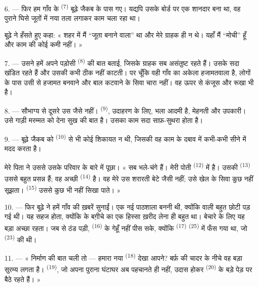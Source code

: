 6. --- फिर हम गाँव के  \textsuperscript{(7)} बूढ़े जैकब के पास गए।
यद्यपि उसके बोर्ड पर एक शानदार  बना था, वह पुराने घिसे जूतों में नया
तला लगाकर काम चला रहा था।

बूढ़े ने हँसते हुए कहा: « शहर में मैं “जूता बनाने वाला” था और मेरे ग्राहक ही न
थे। यहाँ मैं “मोची” हूँ और काम की कोई कमी नहीं। »

7. --- उसने हमें अपने पड़ोसी  \textsuperscript{(8)} की बात
बताई, जिसके ग्राहक सब असंतुष्ट रहते हैं। उसके  सदा खंडित रहते हैं
और उसकी  कभी ठीक नहीं काटती। पर चूँकि वही गाँव का अकेला
हजामतवाला है, लोगों के पास उसी से हजामत बनवाने और बाल कटवाने के सिवा चारा नहीं।
वह ऊपर से कंजूस और रूखा भी है।

8. --- सौभाग्य से दूसरे  उस जैसे नहीं। 
\textsuperscript{(9)}, उदाहरण के लिए, भला आदमी है, मेहनती और उपकारी। उसे गाड़ी
मरम्मत को देना सुख की बात है। उसका काम सदा साफ़-सुथरा होता है।

9. --- बूढ़े जैकब को  \textsuperscript{(10)} से भी कोई शिकायत न
थी, जिसकी वह काम के दबाव में कभी-कभी  सीने में मदद करता है।

मेरे पिता ने उससे उसके परिवार के बारे में पूछा। « सब भले-चंगे हैं। मेरी पोती
 \textsuperscript{(12)} में है। उसकी 
\textsuperscript{(13)} उससे बहुत प्रसन्न हैं; वह अच्छी 
\textsuperscript{(14)} है। वह मेरे उस शरारती बेटे जैसी नहीं; उसे खेल के सिवा कुछ
नहीं सूझता।  \textsuperscript{(15)} उससे कुछ भी नहीं
सिखा पाते। »

\VUsaut{3.0mm}
\VUsaut{3.0mm}

10. --- फिर बूढ़े ने हमें गाँव की ख़बरें सुनाईं। एक नई पाठशाला बननी थी, क्योंकि
 वाली बहुत छोटी पड़ गई थी। यह सहज होता, क्योंकि
 के बग़ीचे का एक हिस्सा ख़रीद लेना ही बहुत था। बेचारे के लिए
यह बड़ा अच्छा रहता। जब से ठंड पड़ी,  \textsuperscript{(16)} के
 गेहूँ नहीं पीस सके, क्योंकि  \textsuperscript{(17)}
 \textsuperscript{(25)} में फँस गया था, जो 
\textsuperscript{(23)} की थी।

11. --- « निर्माण की बात चली तो — हमारा नया  \textsuperscript{(18)}
देखा आपने? बर्फ़ की चादर के नीचे वह बड़ा सुरम्य लगता है। 
\textsuperscript{(19)}, जो अपना पुराना घंटाघर अब पहचानते ही नहीं, उदास होकर
 \textsuperscript{(20)} के बड़े पेड़ पर बैठे रहते हैं। »

